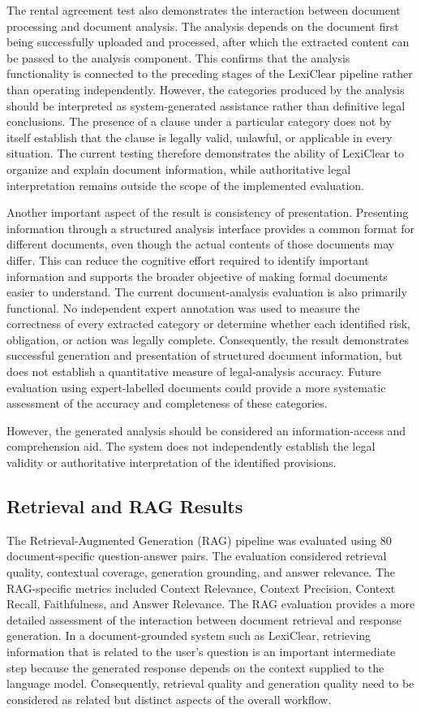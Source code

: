 \documentclass[12pt,a4paper,oneside]{report}
\begin{document}
The rental agreement test also demonstrates the interaction between document processing and document analysis. The analysis depends on the document first being successfully uploaded and processed, after which the extracted content can be passed to the analysis component. This confirms that the analysis functionality is connected to the preceding stages of the LexiClear pipeline rather than operating independently. However, the categories produced by the analysis should be interpreted as system-generated assistance rather than definitive legal conclusions. The presence of a clause under a particular category does not by itself establish that the clause is legally valid, unlawful, or applicable in every situation. The current testing therefore demonstrates the ability of LexiClear to organize and explain document information, while authoritative legal interpretation remains outside the scope of the implemented evaluation.

Another important aspect of the result is consistency of presentation. Presenting information through a structured analysis interface provides a common format for different documents, even though the actual contents of those documents may differ. This can reduce the cognitive effort required to identify important information and supports the broader objective of making formal documents easier to understand. The current document-analysis evaluation is also primarily functional. No independent expert annotation was used to measure the correctness of every extracted category or determine whether each identified risk, obligation, or action was legally complete. Consequently, the result demonstrates successful generation and presentation of structured document information, but does not establish a quantitative measure of legal-analysis accuracy. Future evaluation using expert-labelled documents could provide a more systematic assessment of the accuracy and completeness of these categories.

However, the generated analysis should be considered an information-access and comprehension aid. The system does not independently establish the legal validity or authoritative interpretation of the identified provisions.

\subsection{Retrieval and RAG Results}

The Retrieval-Augmented Generation (RAG) pipeline was evaluated using 80 document-specific question-answer pairs. The evaluation considered retrieval quality, contextual coverage, generation grounding, and answer relevance. The RAG-specific metrics included Context Relevance, Context Precision, Context Recall, Faithfulness, and Answer Relevance. The RAG evaluation provides a more detailed assessment of the interaction between document retrieval and response generation. In a document-grounded system such as LexiClear, retrieving information that is related to the user's question is an important intermediate step because the generated response depends on the context supplied to the language model. Consequently, retrieval quality and generation quality need to be considered as related but distinct aspects of the overall workflow.
\end{document}
